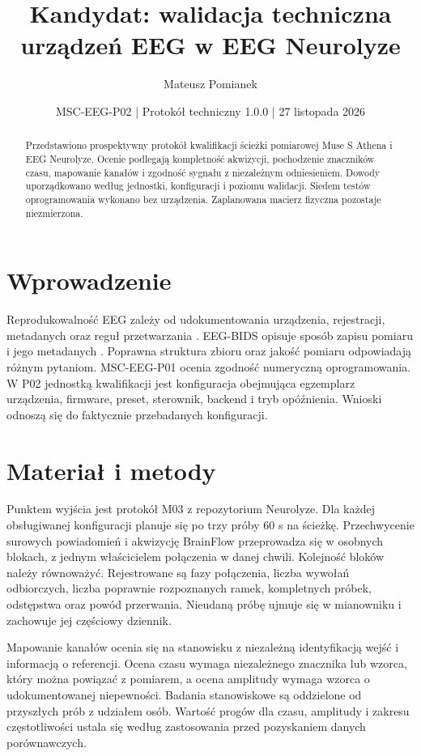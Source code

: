 \documentclass[11pt,a4paper]{article}
\title{Kandydat: walidacja techniczna urządzeń EEG w EEG Neurolyze}
\author{Mateusz Pomianek}
\date{MSC-EEG-P02 | Protokół techniczny 1.0.0 | 27 listopada 2026}
\begin{document}
\maketitle
\begin{abstract}
Przedstawiono prospektywny protokół kwalifikacji ścieżki pomiarowej Muse S Athena i EEG Neurolyze. Ocenie podlegają kompletność akwizycji, pochodzenie znaczników czasu, mapowanie kanałów i zgodność sygnału z niezależnym odniesieniem. Dowody uporządkowano według jednostki, konfiguracji i poziomu walidacji. Siedem testów oprogramowania wykonano bez urządzenia. Zaplanowana macierz fizyczna pozostaje niezmierzona.
\end{abstract}

\section{Wprowadzenie}
Reprodukowalność EEG zależy od udokumentowania urządzenia, rejestracji, metadanych oraz reguł przetwarzania \citep{pernet2020}. EEG-BIDS opisuje sposób zapisu pomiaru i jego metadanych \citep{pernet2019}. Poprawna struktura zbioru oraz jakość pomiaru odpowiadają różnym pytaniom. MSC-EEG-P01 ocenia zgodność numeryczną oprogramowania. W P02 jednostką kwalifikacji jest konfiguracja obejmująca egzemplarz urządzenia, firmware, preset, sterownik, backend i tryb opóźnienia. Wnioski odnoszą się do faktycznie przebadanych konfiguracji.

\section{Materiał i metody}
Punktem wyjścia jest protokół M03 z repozytorium Neurolyze. Dla każdej obsługiwanej konfiguracji planuje się po trzy próby 60 s na ścieżkę. Przechwycenie surowych powiadomień i akwizycję BrainFlow przeprowadza się w osobnych blokach, z jednym właścicielem połączenia w danej chwili. Kolejność bloków należy równoważyć. Rejestrowane są fazy połączenia, liczba wywołań odbiorczych, liczba poprawnie rozpoznanych ramek, kompletnych próbek, odstępstwa oraz powód przerwania. Nieudaną próbę ujmuje się w mianowniku i zachowuje jej częściowy dziennik.

Mapowanie kanałów ocenia się na stanowisku z niezależną identyfikacją wejść i informacją o referencji. Ocena czasu wymaga niezależnego znacznika lub wzorca, który można powiązać z pomiarem, a ocena amplitudy wymaga wzorca o udokumentowanej niepewności. Badania stanowiskowe są oddzielone od przyszłych prób z udziałem osób. Wartość progów dla czasu, amplitudy i zakresu częstotliwości ustala się według zastosowania przed pozyskaniem danych porównawczych.
\end{document}
